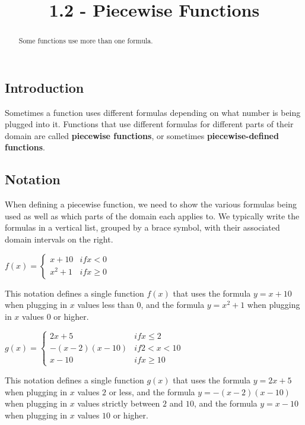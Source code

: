 \documentclass{ximera}
\title{1.2 - Piecewise Functions}
\begin{document}
\begin{abstract}
  Some functions use more than one formula.
\end{abstract}
\maketitle

\subsection*{Introduction}
Sometimes a function uses different formulas depending on what number is being plugged into it. Functions that use different formulas for different parts of their domain are called \textbf{piecewise functions}, or sometimes \textbf{piecewise-defined functions}.

\subsection*{Notation}
When defining a piecewise function, we need to show the various formulas being used as well as which parts of the domain each applies to. We typically write the formulas in a vertical list, grouped by a brace symbol, with their associated domain intervals on the right.

\begin{example}
$f(x)=\begin{cases} x+10 &  \textit{if} x<0\\x^2+1 &  \textit{if} x\geq 0\end{cases}$

This notation defines a single function $f(x)$ that uses the formula $y=x+10$ when plugging in $x$ values less than $0$, and the formula $y=x^2+1$ when plugging in $x$ values $0$ or higher.
\end{example}

\begin{example}
$g(x)=\begin{cases} 2x+5 & \textit{if}x\leq 2\\ -(x-2)(x-10) & \textit{if} 2<x<10\\ x-10 & \textit{if} x\geq 10\end{cases}$

This notation defines a single function $g(x)$ that uses the formula $y=2x+5$ when plugging in $x$ values $2$ or less, and the formula $y=-(x-2)(x-10)$ when plugging in $x$ values strictly between $2$ and $10$, and the formula $y=x-10$ when plugging in $x$ values $10$ or higher.
\end{example}
\end{document}
